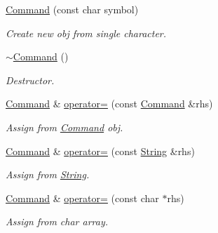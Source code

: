 \begin{DoxyCompactItemize}
\mbox{\label{class_command_ac86295c87439d6e845bb47e702be5e9e}} 
\hyperlink{class_command_ac86295c87439d6e845bb47e702be5e9e}{Command} (const char symbol)
\begin{DoxyCompactList}\small\item\em Create new obj from single character. \end{DoxyCompactList}\item 
\mbox{\label{class_command_ab552bb3a07fdd1acbfd8ea76e69b2278}} 
\hyperlink{class_command_ab552bb3a07fdd1acbfd8ea76e69b2278}{$\sim$\+Command} ()
\begin{DoxyCompactList}\small\item\em Destructor. \end{DoxyCompactList}\item 
\mbox{\label{class_command_a6f283aa5560e5e044b53aa1f5739d7ed}} 
\hyperlink{class_command}{Command} \& \hyperlink{class_command_a6f283aa5560e5e044b53aa1f5739d7ed}{operator=} (const \hyperlink{class_command}{Command} \&rhs)
\begin{DoxyCompactList}\small\item\em Assign from \hyperlink{class_command}{Command} obj. \end{DoxyCompactList}\item 
\mbox{\label{class_command_a8b6fd56b6bbcc598523ab947367720c1}} 
\hyperlink{class_command}{Command} \& \hyperlink{class_command_a8b6fd56b6bbcc598523ab947367720c1}{operator=} (const \hyperlink{class_string}{String} \&rhs)
\begin{DoxyCompactList}\small\item\em Assign from \hyperlink{class_string}{String}. \end{DoxyCompactList}\item 
\mbox{\label{class_command_a7fa1e89e5a4aa8fed864046f20db1a3b}} 
\hyperlink{class_command}{Command} \& \hyperlink{class_command_a7fa1e89e5a4aa8fed864046f20db1a3b}{operator=} (const char $\ast$rhs)
\begin{DoxyCompactList}\small\item\em Assign from char array. \end{DoxyCompactList}\item 
\mbox{\label{class_command_ab9b317d3af1cb59a7c402b9a41b7f624}} 

\end{DoxyCompactItemize}
